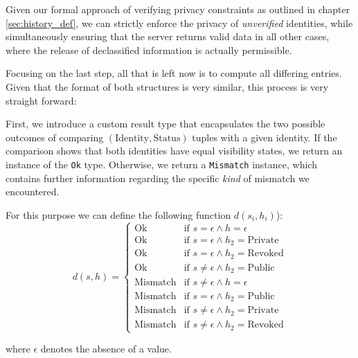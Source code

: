 Given our formal approach of verifying privacy constraints as outlined in chapter \ref{sec:history_def}, we can strictly enforce the privacy of \emph{unverified} identities, while simultaneously ensuring that the server returns valid data in all other cases, where the release of declassified information is actually permissible. 


Focusing on the last step, all that is left now is to compute all differing entries. Given that the format of both structures is very similar, this process is very straight forward: 

First, we introduce a custom result type that encapsulates the two possible outcomes of comparing $(\text{Identity},\text{Status})$ tuples with a given identity. If the comparison shows that both identities have equal visibility states, we return an instance of the \texttt{Ok} type. Otherwise, we return a \texttt{Mismatch} instance, which contains further information regarding the specific \emph{kind} of mismatch we encountered. 

 For this purpose we can define the following function \(d(s_i,h_i)\)): 
\[
    d(s,h) = \begin{cases}
        \text{Ok} & \text{if } s = \epsilon \wedge h = \epsilon \\
        \text{Ok} & \text{if } s = \epsilon \wedge h_2 = \text{Private} \\
        \text{Ok} & \text{if } s = \epsilon \wedge h_2 = \text{Revoked} \\
        \text{Ok} & \text{if } s \neq \epsilon \wedge h_2 = \text{Public} \\

        \text{Mismatch} & \text{if } s \neq \epsilon \wedge h = \epsilon \\
        \text{Mismatch} & \text{if } s = \epsilon \wedge h_2 = \text{Public} \\
        \text{Mismatch} & \text{if } s \neq \epsilon \wedge h_2 = \text{Private} \\
        \text{Mismatch} & \text{if } s \neq \epsilon \wedge h_2 = \text{Revoked} 
    \end{cases}    
\]

where \(\epsilon\) denotes the absence of a value.

